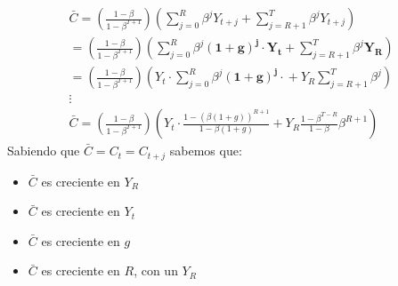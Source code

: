 \documentclass[12pt]{article}
\begin{document}
\begin{figure} [H]
        \centering
        
        \label{fig:placeholder}
\end{figure}
\begin{align*}
    \bar{C}=(\frac{1-\beta}{1-\beta^{T+1}})(\sum_{j=0}^R\beta^jY_{t+j}+\sum_{j=R+1}^T\beta^jY_{t+j})\\
    =(\frac{1-\beta}{1-\beta^{T+1}})(\sum_{j=0}^R\beta^j\mathbf{(1+g)^j\cdot Y_t}+\sum_{j=R+1}^T\beta^j\mathbf{Y_R})\\
    =(\frac{1-\beta}{1-\beta^{T+1}})(Y_t \cdot\sum_{j=0}^R\beta^j\mathbf{(1+g)^j\cdot }+Y_R\sum_{j=R+1}^T\beta^j)\\
    \vdots\\
    \bar{C}=(\frac{1-\beta}{1-\beta^{T+1}})(Y_t \cdot \frac{1-(\beta(1+g))^{R+1}}{1-\beta(1+g)} +Y_R \frac{1-\beta^{T-R}}{1-\beta}\beta^{R+1})
\end{align*}
Sabiendo que $\bar{C}=C_t=C_{t+j}$ sabemos que: 
\begin{itemize}
    \item $\bar{C}$ es creciente en $Y_R$
    \item $\bar{C}$ es creciente en $Y_t$
    \item $\bar{C}$ es creciente en $g$
    \item $\bar{C}$ es creciente en $R$, con un $Y_R$
\end{itemize}
\end{document}
